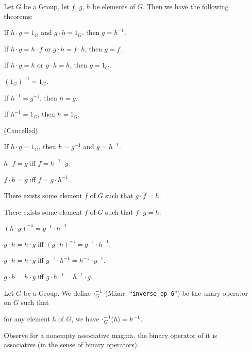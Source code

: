 \documentclass{article}
\begin{document}
Let $G$ be a Group, let $f$, $g$, $h$ be elements of $G$. Then we have
the following theorems:
\begin{thm}
\item\label{group1:5} If $h\cdot g=1_{G}$ and $g\cdot h=1_{G}$, then $g=h^{-1}$.
\item\label{group1:6} If $h\cdot g=h\cdot f$ or $g\cdot h=f\cdot h$,
  then $g=f$.
\item\label{group1:7} If $h\cdot g=h$ or $g\cdot h=h$, then $g=1_{G}$.
\item\label{group1:8} $(1_{G})^{-1}=1_{G}$. 
\item\label{group1:9} If $h^{-1}=g^{-1}$, then $h=g$.
\item\label{group1:10} If $h^{-1}=1_{G}$, then $h=1_{G}$.
\item\label{group1:11} (Cancelled)
\item\label{group1:12} If $h\cdot g=1_{G}$, then $h=g^{-1}$ and $g=h^{-1}$.
\item\label{group1:13} $h\cdot f=g$ iff $f=h^{-1}\cdot g$.
\item\label{group1:14} $f\cdot h=g$ iff $f=g\cdot h^{-1}$.
\item\label{group1:15} There exists some element $f$ of $G$ such that
  $g\cdot f=h$.
\item\label{group1:16} There exists some element $f$ of $G$ such that
  $f\cdot g=h$.
\item\label{group1:17} $(h\cdot g)^{-1}=g^{-1}\cdot h^{-1}$
\item\label{group1:18} $g\cdot h=h\cdot g$ iff $(g\cdot h)^{-1}=g^{-1}\cdot h^{-1}$.
\item\label{group1:19} $g\cdot h=h\cdot g$ iff $g^{-1}\cdot h^{-1}=h^{-1}\cdot g^{-1}$.
\item\label{group1:20} $g\cdot h=h\cdot g$ iff $g\cdot h^{-1}=h^{-1}\cdot g$.
\end{thm}

\begin{definition}
Let $G$ be a Group.
We define $\cdot_{G}^{-1}$ (Mizar: ``\verb#inverse_op G#'') be the unary operator on $G$ such that
\begin{defn}
\item for any element $h$ of $G$, we have $\cdot_{G}^{-1}(h)=h^{-1}$.
\end{defn}
\end{definition}

Observe for a nonempty associative magma, the binary operator of it is
associative (in the sense of binary operators).
\end{document}
